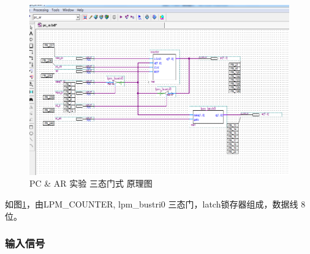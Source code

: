 \begin{figure}[H]
\centering
\includegraphics[width=\textwidth]{images/prin4_2.png}
\caption{PC \& AR 实验 三态门式 原理图}
\label{fig:prin4_2}
\end{figure}

如图\ref{fig:prin4_2}，由LPM\_COUNTER, lpm\_bustri0 三态门，latch锁存器组成，数据线 8 位。

\subsubsection{输入信号}

